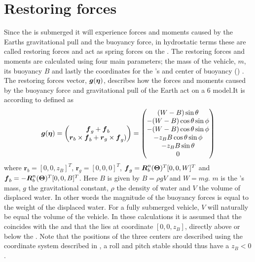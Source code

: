 \section{Restoring forces}
Since the \abbrROV is submerged it will experience forces and moments caused by the Earths gravitational pull and the buoyancy force, in hydrostatic terms these are called restoring forces and act as spring forces on the \abbrROV \citep{fossen2011}. The restoring forces and moments are calculated using four main parameters; the mass of the vehicle, $m$, its buoyancy $B$ and lastly the coordinates for the \abbrROV's \abbrCG and center of buoyancy (\abbrCB) \citep{fossen2011}. The restoring forces vector, $\boldsymbol{g}(\boldsymbol{\eta})$, describes how the forces and moments caused by the buoyancy force and gravitational pull of the Earth act on a 6 \abbrDOF model.It is according to \citet[p.60]{fossen2011} defined as
\begin{equation} \label{eq:restoring_forces}
    \boldsymbol{g}(\boldsymbol{\eta}) =
     \begin{pmatrix}
    \boldsymbol{f}_g + \boldsymbol{f}_b \\
    \boldsymbol{r}_b \times \boldsymbol{f}_b + \boldsymbol{r}_g \times \boldsymbol{f}_g) 
     \end{pmatrix} 
     =
    \begin{pmatrix}
        (W - B) \sin \theta\\
    -(W - B) \cos \theta \sin \phi\\
    -(W - B) \cos \theta \sin \phi\\
    -z_B B \cos \theta \sin \phi\\
    -z_B B \sin \theta\\
    0\\
    \end{pmatrix}
\end{equation}
where $\boldsymbol{r}_b = [0, 0, z_B]^T$, $\boldsymbol{r}_g = [0, 0, 0]^T$, $\boldsymbol{f}_g = \boldsymbol{R}^n_b(\boldsymbol{\Theta})^T [0, 0, W]^T$ and $\boldsymbol{f}_b = -\boldsymbol{R}^n_b(\boldsymbol{\Theta})^T [0, 0, B]^T$.
Here $B$ is given by $B = \rho g V$ and $W = m g$. $m$ is the \abbrROV's mass, $g$ the gravitational constant, $\rho$ the density of water and $V$ the volume of displaced water. In other words the magnitude of the buoyancy forces is equal to the weight of the displaced water. For a fully submerged vehicle, $V$ will naturally be equal the volume of the vehicle.
In these calculations it is assumed that the \abbrCG coincides with the \abbrCO and that the \abbrCB lies at coordinate $[0, 0, z_B]$, directly above or below the \abbrCO. Note that the positions of the three centers are described using the coordinate system described in , a roll and pitch stable \abbrROV should thus have a $z_B < 0$.

